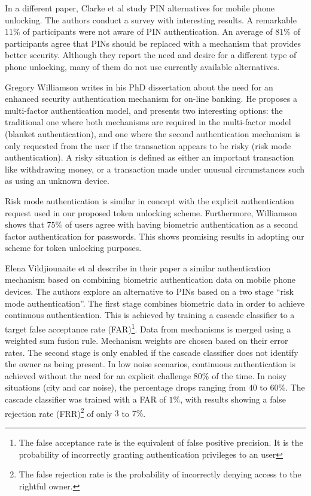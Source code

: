 In a different paper, Clarke et al \cite{clarke2002acceptance} study PIN alternatives for mobile phone unlocking. The authors conduct a survey with interesting results. A remarkable $11\%$ of participants were not aware of PIN authentication. An average of $81\%$ of participants agree that PINs should be replaced with a mechanism that provides better security. Although they report the need and desire for a different type of phone unlocking, many of them do not use currently available alternatives.

Gregory Williamson \cite{williamson2006enhanced} writes in his PhD dissertation  about the need for an enhanced security authentication mechanism for on-line banking. He proposes a multi-factor authentication model, and presents two interesting options: the traditional one where both mechanisms are required in the multi-factor model (blanket authentication), and one where the second authentication mechanism is only requested from the user if the transaction appears to be risky (risk mode authentication). A risky situation is defined as either an important transaction like withdrawing money, or a transaction made under unusual circumstances such as using an unknown device. 

Risk mode authentication is similar in concept with the explicit authentication request used in our proposed token unlocking scheme. Furthermore, Williamson shows that $75\%$ of users agree with having biometric authentication as a second factor authentication for passwords. This shows promising results in adopting our scheme for token unlocking purposes.

Elena Vildjiounaite et al describe in their paper \cite{vildjiounaite2007increasing} a similar authentication mechanism based on combining biometric authentication data on mobile phone devices. The authors explore an alternative to PINs based on a two stage ``risk mode authentication''. The first stage combines biometric data in order to achieve continuous authentication. This is achieved by training a cascade classifier to a target false acceptance rate (FAR)\footnote{The false acceptance rate is the equivalent of false positive precision. It is the probability of incorrectly granting authentication privileges to an user}. Data from mechanisms is merged using a weighted sum fusion rule. Mechanism weights are chosen based on their error rates. The second stage is only enabled if the cascade classifier does not identify the owner as being present. In low noise scenarios, continuous authentication is achieved without the need for an explicit challenge $80\%$ of the time. In noisy situations (city and car noise), the percentage drops ranging from $40$ to $60\%$. The cascade classifier was trained with a FAR of $1\%$, with results showing a false rejection rate (FRR)\footnote{The false rejection rate is the probability of incorrectly denying access to the rightful owner.} of only $3$ to $7\%$.

